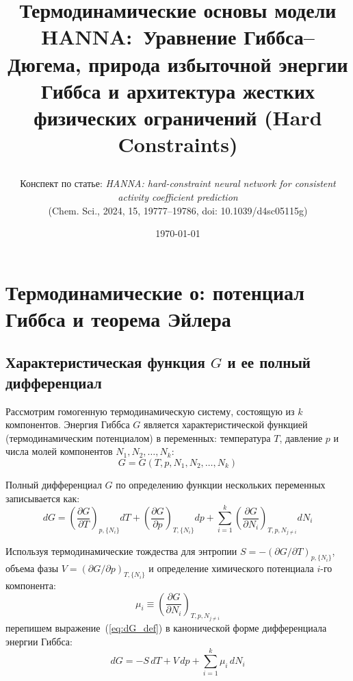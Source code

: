 \documentclass[12pt,a4paper]{article}
\title{\parbox{0.9\textwidth}{\centering\textbf{Термодинамические основы модели HANNA:\
Уравнение Гиббса--Дюгема, природа избыточной энергии Гиббса и архитектура жестких физических ограничений (Hard Constraints)}}}
\author{\parbox{0.9\textwidth}{\centering
Конспект по статье: \textit{HANNA: hard-constraint neural network for consistent activity coefficient prediction}\\
(Chem. Sci., 2024, 15, 19777--19786, doi: 10.1039/d4sc05115g)}}
\date{\today}
\begin{document}
\maketitle

\tableofcontents
\newpage

\section[Термодинамические основы]{Термодинамические о: потенциал Гиббса и теорема Эйлера}

\subsection{Характеристическая функция \texorpdfstring{$G$}{G} и ее полный дифференциал}
Рассмотрим гомогенную термодинамическую систему, состоящую из $k$ компонентов. Энергия Гиббса $G$ является характеристической функцией (термодинамическим потенциалом) в переменных: температура $T$, давление $p$ и числа молей компонентов $N_1, N_2, \dots, N_k$:
\begin{equation}
    G = G(T, p, N_1, N_2, \dots, N_k)
\end{equation}

Полный дифференциал $G$ по определению функции нескольких переменных записывается как:
\begin{equation}
    dG = \left(\frac{\partial G}{\partial T}\right)_{p, \{N_i\}} dT + \left(\frac{\partial G}{\partial p}\right)_{T, \{N_i\}} dp + \sum_{i=1}^k \left(\frac{\partial G}{\partial N_i}\right)_{T, p, N_{j \neq i}} dN_i
    \label{eq:dG_def}
\end{equation}

Используя термодинамические тождества для энтропии $S = -(\partial G / \partial T)_{p,\{N_i\}}$, объема фазы $V = (\partial G / \partial p)_{T,\{N_i\}}$ и определение химического потенциала $i$-го компонента:
\begin{equation}
    \mu_i \equiv \left(\frac{\partial G}{\partial N_i}\right)_{T, p, N_{j \neq i}}
    \label{eq:mu_def}
\end{equation}
перепишем выражение~(\ref{eq:dG_def}) в канонической форме дифференциала энергии Гиббса:
\begin{equation}
    dG = -S\,dT + V\,dp + \sum_{i=1}^k \mu_i\,dN_i
    \label{eq:dG_canonical}
\end{equation}
\end{document}

